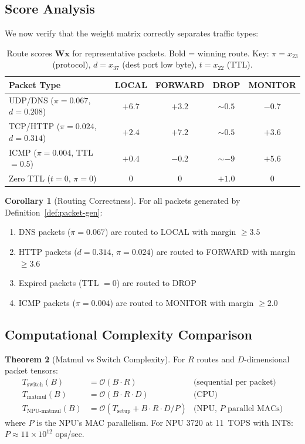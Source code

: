 \documentclass[11pt,a4paper,twoside]{article}
\theoremstyle{definition}
\newtheorem{theorem}{Theorem}[section]
\newtheorem{corollary}[theorem]{Corollary}
\theoremstyle{remark}
\newcommand{\BigO}{\mathcal{O}}
\newcommand{\mat}[1]{\mathbf{#1}}
\newcommand{\vect}[1]{\mathbf{#1}}
\begin{document}
\subsection{Score Analysis}

We now verify that the weight matrix correctly separates traffic types:

\begin{table}[H]
\centering
\begin{tabular}{lcccc}
\toprule
\textbf{Packet Type} & \textbf{LOCAL} & \textbf{FORWARD} & \textbf{DROP} & \textbf{MONITOR} \\
\midrule
UDP/DNS ($\pi{=}0.067$, $d{=}0.208$)
  & $\mathbf{+6.7}$ & $+3.2$ & ${\sim}0.5$ & $-0.7$ \\
TCP/HTTP ($\pi{=}0.024$, $d{=}0.314$)
  & $+2.4$ & $\mathbf{+7.2}$ & ${\sim}0.5$ & $+3.6$ \\
ICMP ($\pi{=}0.004$, TTL${=}0.5$)
  & $+0.4$ & $-0.2$ & ${\sim}{-}9$ & $\mathbf{+5.6}$ \\
Zero TTL ($t{=}0$, $\pi{=}0$)
  & $0$ & $0$ & $\mathbf{+1.0}$ & $0$ \\
\bottomrule
\end{tabular}
\caption{Route scores $\mat{W}\vect{x}$ for representative packets. Bold = winning route. Key: $\pi = x_{23}$ (protocol), $d = x_{37}$ (dest port low byte), $t = x_{22}$ (TTL).}
\label{tab:route-scores}
\end{table}

\begin{corollary}[Routing Correctness]
For all packets generated by Definition~\ref{def:packet-gen}:
\begin{enumerate}[label=(\roman*)]
  \item DNS packets ($\pi = 0.067$) are routed to LOCAL with margin $\geq 3.5$
  \item HTTP packets ($d = 0.314$, $\pi = 0.024$) are routed to FORWARD with margin $\geq 3.6$
  \item Expired packets (TTL $= 0$) are routed to DROP
  \item ICMP packets ($\pi = 0.004$) are routed to MONITOR with margin $\geq 2.0$
\end{enumerate}
\end{corollary}

\subsection{Computational Complexity Comparison}

\begin{theorem}[Matmul vs Switch Complexity]
\label{thm:complexity}
For $R$ routes and $D$-dimensional packet tensors:
\begin{align}
T_{\text{switch}}(B) &= \BigO(B \cdot R) & \text{(sequential per packet)} \\
T_{\text{matmul}}(B) &= \BigO(B \cdot R \cdot D) & \text{(CPU)} \\
T_{\text{NPU-matmul}}(B) &= \BigO(T_{\text{setup}} + B \cdot R \cdot D / P) & \text{(NPU, $P$ parallel MACs)}
\end{align}
where $P$ is the NPU's MAC parallelism. For NPU 3720 at 11~TOPS with INT8: $P \approx 11 \times 10^{12}$ ops/sec.
\end{theorem}
\end{document}
